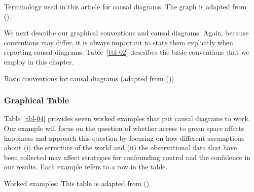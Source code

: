 \documentclass[
  singlecolumn]{article}
\begin{document}
\begin{table}

\caption{\label{tbl-01}Terminology used in this article for causal
diagrams. The graph is adapted from
().}

\centering{

\terminologylocalconventionssimple

}

\end{table}%

We next describe our graphical conventions and causal diagrams. Again,
because conventions may differ, it is always important to state them
explicitly when reporting causal diagrams. Table~\ref{tbl-02} describes
the basic conventions that we employ in this chapter.

\begin{table}

\caption{\label{tbl-02}Basic conventions for causal diagrams (adapted
from ()).}

\centering{

\terminologygeneralbasic

}

\end{table}%

\subsubsection{Graphical Table}\label{graphical-table}

Table~\ref{tbl-04} provides seven worked examples that put causal
diagrams to work. Our example will focus on the question of whether
access to green space affects happiness and approach this question by
focusing on how different assumptions about (i) the structure of the
world and (ii) the observational data that have been collected may
affect strategies for confounding control and the confidence in our
results. Each example refers to a row in the table.

\begin{table}

\caption{\label{tbl-04}Worked examples: This table is adapted from
().}

\centering{

\terminologyelconfoundersLONG

}

\end{table}%
\end{document}

